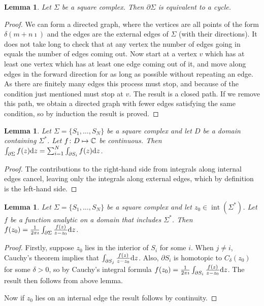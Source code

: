 \documentclass{notes}
\theoremstyle{plain}
\newtheorem{lemma}[proposition]{Lemma}
\DeclareMathOperator{\inter}{int}
\begin{document}
\begin{lemma}
Let $\Sigma$ be a square complex.  Then $\partial \Sigma$ is equivalent to a
cycle.
\end{lemma}

\begin{proof}
We can form a directed graph, where the vertices are all points of the form
$\delta(m + n \imath)$ and the edges are the external edges of $\Sigma$
(with their directions).  It does not take long to check that at any vertex
the number of edges going in equals the number of edges coming out.  Now start
at a vertex $v$ which has at least one vertex which has at least one edge
coming out of it, and move along edges in the forward direction for as long as
possible without repeating an edge.  As there are finitely many edges this
process must stop, and because of the condition just mentioned must stop at
$v$.  The result is a closed path.  If we remove this path, we obtain a
directed graph with fewer edges satisfying the same condition, so by induction
the result is proved.
\end{proof}

\begin{lemma}
Let $\Sigma = \{ S_1, \dots, S_N \}$ be a square complex and let $D$ be a
domain containing $\Sigma^*$.  Let $f \colon D \mapsto \mathbb{C}$ be continuous.  Then
$\int_{\partial \Sigma} f(z) \mathrm{d} z = \sum_{i=1}^N \int_{\partial S_i} f(z) \mathrm{d} z$.
\end{lemma}

\begin{proof}
The contributions to the right-hand side from integrals along internal edges
cancel, leaving only the integrals along external edges, which by definition
is the left-hand side.
\end{proof}

\begin{lemma}
Let $\Sigma = \{ S_1, \dots, S_N \}$ be a square complex and let
$z_0 \in \inter (\Sigma^*)$.  Let $f$ be a function analytic on a domain that
includes $\Sigma^*$.  Then $f(z_0) = \frac{1}{2 \pi \imath} \int_{\partial
\Sigma} \frac{f(z)}{z-z_0} \mathrm{d} z$.
\end{lemma}

\begin{proof}
Firstly, suppose $z_0$ lies in the interior of $S_i$ for some $i$.  When
$j \neq i$, Cauchy's theorem implies that $\int_{\partial S_j} \frac{f(z)}
{z-z_0} \mathrm{d} z$.  Also, $\partial S_i$ is homotopic to $C_\delta (z_0)$ for some
$\delta > 0$, so by Cauchy's integral formula $f(z_0) = \frac{1}{2 \pi \imath}
\int_{\partial S_i} \frac{f(z)}{z-z_0} \mathrm{d} z$.  The result then follows from
above lemma.

Now if $z_0$ lies on an internal edge the result follows by continuity. 
\end{proof}
\end{document}
